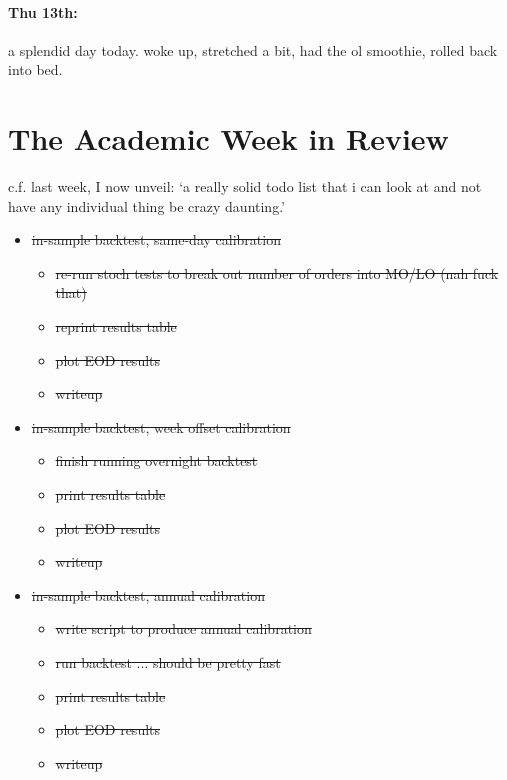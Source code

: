\documentclass[12pt]{article}
\begin{document}
\paragraph{Thu 13th:} a splendid day today. woke up, stretched a bit, had the ol smoothie, rolled back into bed.

\section*{The Academic Week in Review}
c.f. last week, I now unveil: `a really solid todo list that i can look at and not have any individual thing be crazy daunting.'

\clearpage 

\begin{itemize}[topsep=0pt,itemsep=0ex,partopsep=0ex,parsep=0ex]
\item \st{in-sample backtest, same-day calibration}
\begin{itemize}[topsep=0pt,itemsep=0ex,partopsep=0ex,parsep=0ex]
\item \st{re-run stoch tests to break out number of orders into MO/LO (nah fuck that)}
\item \st{reprint results table}
\item \st{plot EOD results}
\item \st{writeup}
\end{itemize}

\item \st{in-sample backtest, week offset calibration}
\begin{itemize}[topsep=0pt,itemsep=0ex,partopsep=0ex,parsep=0ex]
\item \st{finish running overnight backtest}
\item \st{print results table}
\item \st{plot EOD results}
\item \st{writeup}
\end{itemize}

\item \st{in-sample backtest, annual calibration}
\begin{itemize}[topsep=0pt,itemsep=0ex,partopsep=0ex,parsep=0ex]
\item \st{write script to produce annual calibration}
\item \st{run backtest ... should be pretty fast}
\item \st{print results table}
\item \st{plot EOD results}
\item \st{writeup}
\end{itemize}


\end{itemize}
\end{document}
